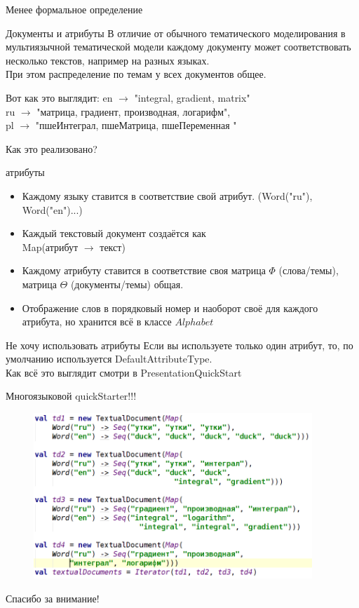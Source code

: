\documentclass{beamer}
\begin{document}
\begin{frame}{Менее формальное определение}
    \begin{block}{Документы и атрибуты}
	В отличие от обычного тематического моделирования в мультиязычной тематической модели каждому документу может соответствовать несколько текстов, например на разных языках.\\
	При этом распределение по темам у всех документов общее. 
	
    \end{block}

    \begin{block}{Вот как это выглядит:}
	en $\to$ "integral, gradient, matrix" \\ ru $\to$ "матрица, градиент, производная, логарифм", \\ pl $\to$ "пшеИнтеграл, пшеМатрица, пшеПеременная "
    \end{block}
\end{frame}

\begin{frame}{Как это реализовано?}
    \begin{block}{атрибуты}
	\begin{itemize}
	    \item Каждому языку ставится в соответствие свой атрибут. (Word("ru"), Word("en")...)
	    \item Каждый текстовый документ создаётся как\\ Map(атрибут $\to$ текст)
	    \item Каждому атрибуту ставится в соответствие своя матрица $\Phi$ (слова/темы), матрица $\Theta$ (документы/темы) общая. 
	    \item Отображение слов в порядковый номер и наоборот своё для каждого атрибута, но хранится всё в классе $Alphabet$
	\end{itemize}
    \end{block}

    \begin{block}{Не хочу использовать атрибуты}
	Если вы используете только один атрибут, то, по умолчанию используется DefaultAttributeType. \\
	Как всё это выглядит смотри в PresentationQuickStart
    \end{block}
\end{frame}

\begin{frame}{Многоязыковой quickStarter!!!}
    \begin{figure}[ht!]
	\centering
	\includegraphics[width=105mm]{multilingualQS}
	\label{overflow}
    \end{figure}
\end{frame}

\begin{frame}
    \begin{center}
	\Huge Спасибо за внимание!
    \end{center}
\end{frame}
\end{document}
